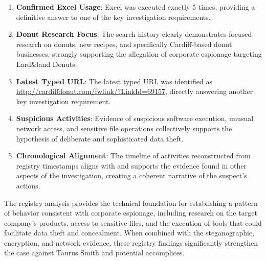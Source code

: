 \begin{enumerate}
    \item \textbf{Confirmed Excel Usage}: Excel was executed exactly 5 times, providing a definitive answer to one of the key investigation requirements.
    
    \item \textbf{Donut Research Focus}: The search history clearly demonstrates focused research on donuts, new recipes, and specifically Cardiff-based donut businesses, strongly supporting the allegation of corporate espionage targeting Lard\&land Donuts.
    
    \item \textbf{Latest Typed URL}: The latest typed URL was identified as \url{http://cardiffdonut.com/fwlink/?LinkId=69157}, directly answering another key investigation requirement.
    
    \item \textbf{Suspicious Activities}: Evidence of suspicious software execution, unusual network access, and sensitive file operations collectively supports the hypothesis of deliberate and sophisticated data theft.
    
    \item \textbf{Chronological Alignment}: The timeline of activities reconstructed from registry timestamps aligns with and supports the evidence found in other aspects of the investigation, creating a coherent narrative of the suspect's actions.
\end{enumerate}

The registry analysis provides the technical foundation for establishing a pattern of behavior consistent with corporate espionage, including research on the target company's products, access to sensitive files, and the execution of tools that could facilitate data theft and concealment. When combined with the steganographic, encryption, and network evidence, these registry findings significantly strengthen the case against Taurus Smith and potential accomplices.